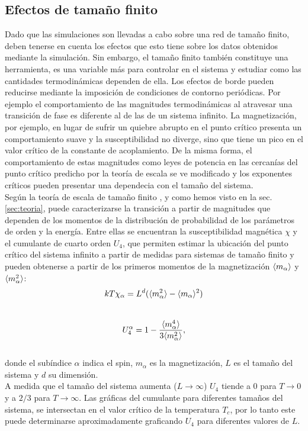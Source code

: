 
\subsection{Efectos de tamaño finito}
\label{sec:tamfin}
Dado que las simulaciones son llevadas a cabo sobre una red de tamaño finito, deben tenerse en cuenta los efectos que esto tiene sobre los datos
 obtenidos mediante la simulación. Sin embargo, el tamaño finito también constituye una herramienta, es una variable más para controlar en el sistema
 y estudiar como las cantidades termodinámicas dependen de ella. Los efectos de borde pueden reducirse mediante la imposición de condiciones de contorno periódicas.
Por ejemplo el comportamiento de las magnitudes termodinámicas al atravesar una transición de fase es diferente al de las de un sistema infinito. La magnetización,
 por ejemplo, en lugar de sufrir un quiebre abrupto en el punto crítico presenta un comportamiento suave y la susceptibilidad no diverge, sino que tiene
 un pico en el valor crítico de la constante de acoplamiento. De la misma forma, el comportamiento de estas magnitudes como leyes de potencia en las cercanías
 del punto crítico predicho por la teoría de escala se ve modificado y los exponentes críticos pueden presentar una dependecia con el tamaño del sistema.\\
Según la teoría de escala de tamaño finito \cite{binder_book}, y como hemos visto en la sec. \ref{sec:teoria}, puede caracterizarse la transición a partir de magnitudes que dependen de los momentos
 de la distribución de probabilidad de los parámetros de orden y la energía. Entre ellas se encuentran la susceptibilidad magnética $\chi$ y el cumulante
 de cuarto orden $U_{4}$, que permiten estimar la ubicación del punto crítico del sistema infinito a partir de medidas para sistemas de tamaño finito
 y pueden obtenerse a partir de los primeros momentos de la magnetización $\langle m_{\alpha} \rangle$ y $\langle m_{\alpha}^{2} \rangle$:
\\
\begin{equation}
	\label{eq:suscept}
	kT\chi_{\alpha} = L^{d}(\langle m_{\alpha}^{2} \rangle-\langle m_{\alpha} \rangle^{2}) \\
\end{equation}
\\
\begin{equation}
	U_{4}^{\alpha}=1-\frac{\langle m_{\alpha}^{4} \rangle}{3\langle m_{\alpha}^{2} \rangle},
	\label{eq:cumul4}
\end{equation}
\\
donde el subíndice $\alpha$ indica el spin, $m_{\alpha}$ es la magnetización, $L$ es el tamaño del sistema y $d$ su dimensión.\\
A medida que el tamaño del sistema aumenta ($L\rightarrow\infty$) $U_{4}$ tiende a $0$ para $T\rightarrow 0$ y a $2/3$ para $T\rightarrow\infty$. Las gr\'aficas del cumulante
 para diferentes tamaños del sistema, se intersectan en el valor crítico de la temperatura $T_{c}$, por lo tanto este puede determinarse aproximadamente graficando $U_{4}$ para diferentes
 valores de $L$.\\

